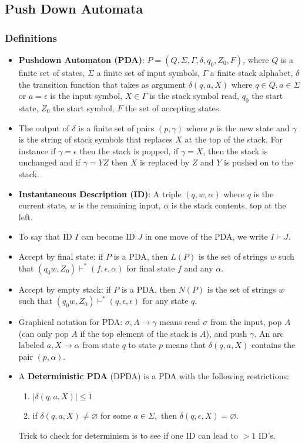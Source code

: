 \subsection{\color{ForestGreen}Push Down Automata}
\subsubsection{Definitions}
\begin{itemize}
    \item \textbf{Pushdown Automaton (PDA)}: $P =(Q , \Sigma, \Gamma, \delta, q_0, Z_0, F)$, where $Q$ is a finite set of states, $\Sigma$ a finite set of input symbols, $\Gamma$ a finite stack alphabet, $\delta$ the transition function that takes as argument $\delta(q, a , X)$ where $q\in Q, a\in \Sigma$ or $a = \epsilon$ is the input symbol, $X \in \Gamma$ is the stack symbol read, $q_0$ the start state, $Z_0$ the start symbol, $F$ the set of accepting states.  
    \item The output of $\delta$ is a finite set of pairs $(p, \gamma)$ where $p$ is the new state and $\gamma$ is the string of stack symbols that replaces $X$ at the top of the stack. For instance if $\gamma = \epsilon$ then the stack is popped, if $\gamma = X$, then the stack is unchanged and if $\gamma = YZ$ then $X$ is replaced by $Z$ and $Y$ is pushed
on to the stack.
\item \textbf{Instantaneous Description (ID)}: A triple $(q, w, \alpha)$ where $q$ is the current state, $w$ is the remaining input, $\alpha$ is the stack contents, top at the left.
\item To say that ID $I$ can become ID $J$ in one move of the PDA, we write $I\vdash J$. 
\item Accept by final state: if $P$ is a PDA, then $L(P)$ is the set of strings $w$ such that $(q_0  w, Z_0) \vdash ^* (f, \epsilon, \alpha)$ for final state $f$ and any $\alpha.$
\item Accept by empty stack: if $P$ is a PDA, then $N(P)$ is the set of strings $w$ such that $(q_0  w, Z_0) \vdash ^* (q, \epsilon, \epsilon)$ for any state $q$.
\item Graphical notation for PDA: $\sigma, A \rightarrow \gamma$ means read $\sigma$ from the input, pop $A$ (can only pop $A$ if the top element of the stack is $A$), and push $\gamma.$ An arc labeled $a, X \rightarrow \alpha $ from state $q$ to state $p$ means that $\delta (q, a , X)$ contains the pair $(p, \alpha ). $

\item A \textbf{Deterministic PDA} (DPDA) is a PDA with the following restrictions: 
\begin{enumerate}
    \item $|\delta (q, a, X) | \leq 1$
    \item if $\delta(q, a, X) \neq \varnothing $ for some $a\in \Sigma, $ then $\delta (q, \epsilon ,X) = \varnothing$.  
\end{enumerate}
Trick to check for determinism is to see if one ID can lead to $>1$ ID's. 
\end{itemize}
